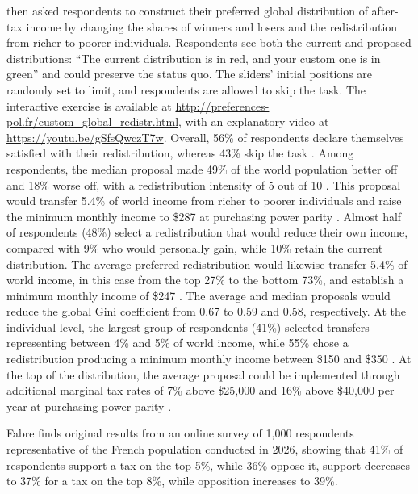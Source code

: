 \citet{fabre_public_2026} then asked respondents to construct their preferred global distribution of after-tax income by changing the shares of winners and losers and the redistribution from richer to poorer individuals. Respondents see both the current and proposed distributions: ``The current distribution is in red, and your custom one is in green'' and could preserve the status quo. The sliders' initial positions are randomly set to limit, and respondents are allowed to skip the task. The interactive exercise is available at \url{http://preferences-pol.fr/custom_global_redistr.html}, with an explanatory video at \url{https://youtu.be/gSfsQwczT7w}. Overall, 56\% of respondents declare themselves satisfied with their redistribution, whereas 43\% skip the task \citep[Figure S51]{fabre_public_2026}. Among respondents, the median proposal made 49\% of the world population better off and 18\% worse off, with a redistribution intensity of 5 out of 10 \citep[Figure S49]{fabre_public_2026}. This proposal would transfer 5.4\% of world income from richer to poorer individuals and raise the minimum monthly income to \$287 at purchasing power parity \citep[Figure S49]{fabre_public_2026}. Almost half of respondents (48\%) select a redistribution that would reduce their own income, compared with 9\% who would personally gain, while 10\% retain the current distribution. The average preferred redistribution would likewise transfer 5.4\% of world income, in this case from the top 27\% to the bottom 73\%, and establish a minimum monthly income of \$247 \citep[Figure S50]{fabre_public_2026}. The average and median proposals would reduce the global Gini coefficient from 0.67 to 0.59 and 0.58, respectively. At the individual level, the largest group of respondents (41\%) selected transfers representing between 4\% and 5\% of world income, while 55\% chose a redistribution producing a minimum monthly income between \$150 and \$350 \citep[Figure S56-57]{fabre_public_2026}. At the top of the distribution, the average proposal could be implemented through additional marginal tax rates of 7\% above \$25,000 and 16\% above \$40,000 per year at purchasing power parity \citep[Figure S69]{fabre_public_2026}.

Fabre finds original results from an online survey of 1,000 respondents representative of the French population conducted in 2026, showing that 41\% of respondents support a tax on the top 5\%, while 36\% oppose it, support decreases to 37\% for a tax on the top 8\%, while opposition increases to 39\%.


